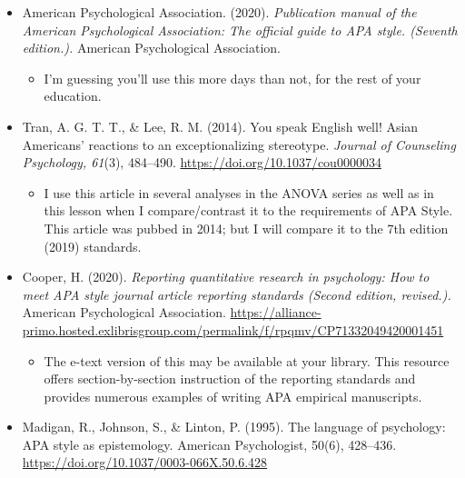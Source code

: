 \documentclass[
  english,
]{book}
\providecommand{\tightlist}{%
  \setlength{\itemsep}{0pt}\setlength{\parskip}{0pt}}
\begin{document}
\begin{itemize}
\tightlist
\item
  American Psychological Association. (2020). \emph{Publication manual of the American Psychological Association: The official guide to APA style. (Seventh edition.).} American Psychological Association.

  \begin{itemize}
  \tightlist
  \item
    I'm guessing you'll use this more days than not, for the rest of your education.
  \end{itemize}
\item
  Tran, A. G. T. T., \& Lee, R. M. (2014). You speak English well! Asian Americans' reactions to an exceptionalizing stereotype. \emph{Journal of Counseling Psychology, 61}(3), 484--490. \url{https://doi.org/10.1037/cou0000034}

  \begin{itemize}
  \tightlist
  \item
    I use this article in several analyses in the ANOVA series as well as in this lesson when I compare/contrast it to the requirements of APA Style. This article was pubbed in 2014; but I will compare it to the 7th edition (2019) standards.
  \end{itemize}
\item
  Cooper, H. (2020). \emph{Reporting quantitative research in psychology: How to meet APA style journal article reporting standards (Second edition, revised.).} American Psychological Association. \url{https://alliance-primo.hosted.exlibrisgroup.com/permalink/f/rpqmv/CP71332049420001451}

  \begin{itemize}
  \tightlist
  \item
    The e-text version of this may be available at your library. This resource offers section-by-section instruction of the reporting standards and provides numerous examples of writing APA empirical manuscripts.
  \end{itemize}
\item
  Madigan, R., Johnson, S., \& Linton, P. (1995). The language of psychology: APA style as epistemology. American Psychologist, 50(6), 428--436. \url{https://doi.org/10.1037/0003-066X.50.6.428}


\end{itemize}
\end{document}

